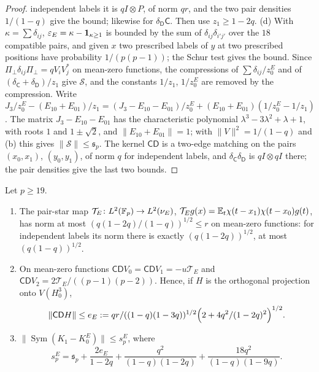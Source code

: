 \begin{proof}
independent labels it is $qI\otimes P$, of norm $qr$, and the two pair densities
$1/(1-q)$ give the bound; likewise for $\delta_{\mathsf D}\mathsf C$. Then use
$z_1\ge1-2q$.
(d) With $\kappa=\sum\delta_{ij}$, $\varepsilon_E=\kappa-\one_{\kappa\ge1}$ is bounded
by the sum of $\delta_{ij}\delta_{i'j'}$ over the $18$ compatible pairs, and given
$x$ two prescribed labels of $y$ at two prescribed positions have probability
$1/(p(p-1))$; the Schur test gives the bound. Since
$\Pi_\perp\delta_{ij}\Pi_\perp=qV_iV_j^*$ on mean-zero functions, the compressions of
$\sum\delta_{ij}/z^E_0$ and of $(\delta_{\mathsf C}+\delta_{\mathsf D})/z_1$ give
$\mathcal S$, and the constants $1/z_1$, $1/z^E_0$ are removed by the
compression. Write $J_3/z^E_0-(E_{10}+E_{01})/z_1=(J_3-E_{10}-E_{01})/z^E_0
+(E_{10}+E_{01})(1/z^E_0-1/z_1)$. The matrix $J_3-E_{10}-E_{01}$ has the
characteristic polynomial $\lambda^3-3\lambda^2+\lambda+1$, with roots $1$ and
$1\pm\sqrt2$, and $\|E_{10}+E_{01}\|=1$; with $\|V\|^2=1/(1-q)$ and (b) this gives
$\|\mathcal S\|\le\mathfrak s_p$. The kernel $\mathsf C\mathsf D$ is a two-edge
matching on the pairs $(x_0,x_1)$, $(y_0,y_1)$, of norm $q$ for independent
labels, and $\delta_{\mathsf C}\delta_{\mathsf D}$ is $qI\otimes qI$ there; the pair
densities give the last two bounds.
\end{proof}

\begin{lemma}\label{lem:record:e-orthogonal}
Let $p\ge19$.
\begin{enumerate}[label=(\alph*)]
\item The pair-star map $\mathcal T_E\colon L^2(\Fp)\to L^2(\nu_E)$,
 $\mathcal T_Eg(x)=\E_t\chi(t-x_1)\chi(t-x_0)g(t)$, has norm at most
 $(q(1-2q)/(1-q))^{1/2}\le r$ on mean-zero functions: for independent labels its
 norm there is exactly $(q(1-2q))^{1/2}$, at most $(q(1-q))^{1/2}$.
\item On mean-zero functions $\mathsf C\mathsf DV_0=\mathsf C\mathsf DV_1=-u\mathcal T_E$
 and $\mathsf C\mathsf DV_2=2\mathcal T_E/((p-1)(p-2))$. Hence, if $H$ is the
 orthogonal projection onto $V(H_0^3)$,
 \[
  \|\mathsf C\mathsf DH\|\le e_E:=\frac{qr}{((1-q)(1-3q))^{1/2}}
  \Bigl(2+\frac{4q^2}{(1-2q)^2}\Bigr)^{1/2}.
 \]
\item $\|\operatorname{Sym}(K_1-K^E_0)\|\le s^E_p$, where
 \[
  s^E_p=\mathfrak s_p+\frac{2e_E}{1-2q}+\frac{q^2}{(1-q)(1-2q)}
  +\frac{18q^2}{(1-q)(1-9q)} .
 \]
\end{enumerate}
\end{lemma}


